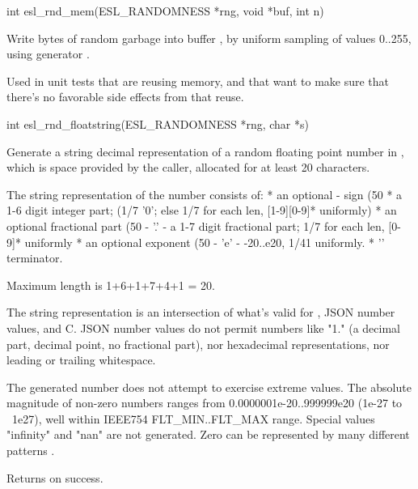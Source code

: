 \begin{sreapi}
\hypertarget{func:esl_rnd_mem()}
{\item[int esl\_rnd\_mem(ESL\_RANDOMNESS *rng, void *buf, int n)]}

Write  bytes of random garbage into buffer
, by uniform sampling of values 0..255,
using generator .

Used in unit tests that are reusing memory, and that
want to make sure that there's no favorable side effects
from that reuse.


\hypertarget{func:esl_rnd_floatstring()}
{\item[int esl\_rnd\_floatstring(ESL\_RANDOMNESS *rng, char *s)]}

Generate a string decimal representation of a random 
floating point number in , which is space provided
by the caller, allocated for at least 20 characters.

The string representation of the number consists of:
* an optional - sign  (50%
* a 1-6 digit integer part; (1/7 '0'; else 1/7 for each len, [1-9][0-9]* uniformly)
* an optional fractional part (50%
- '.'
- a 1-7 digit fractional part; 1/7 for each len, [0-9]* uniformly
* an optional exponent (50%
- 'e'
-  -20..e20, 1/41 uniformly.
* '\0' terminator.

Maximum length is 1+6+1+7+4+1 = 20.

The string representation is an intersection of what's
valid for , JSON number values, and C. JSON
number values do not permit numbers like "1."  (a
decimal part, decimal point, no fractional part), nor
hexadecimal representations, nor leading or trailing
whitespace.

The generated number does not attempt to exercise
extreme values. The absolute magnitude of non-zero
numbers ranges from 0.0000001e-20..999999e20 (1e-27 to
~1e27), well within IEEE754 FLT_MIN..FLT_MAX
range. Special values "infinity" and "nan" are not
generated.  Zero can be represented by many different
patterns .

Returns  on success.


\end{sreapi}

